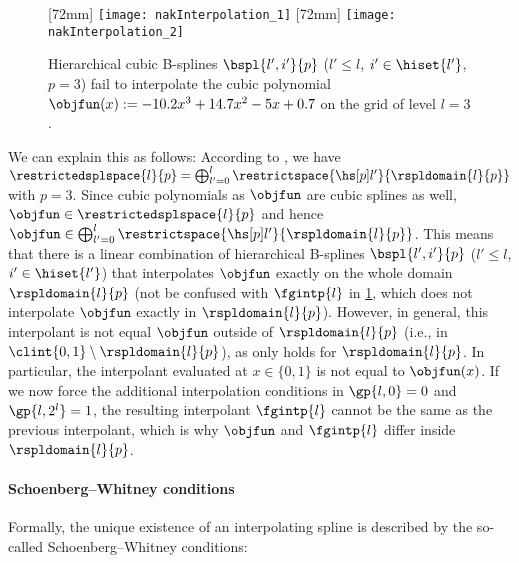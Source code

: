 \begin{figure}
  [72mm]{%
    \texttt{[image: nakInterpolation\_1]}%
  }%
  \hfill%
  [72mm]{%
    \texttt{[image: nakInterpolation\_2]}%
  }%
  \caption[%
    Issues when interpolating with uniform hierarchical B-splines%
  ]{%
    Hierarchical cubic B-splines $\bspl{l',i'}{p}$
    ($l' \le l$, $i' \in \hiset{l'}$, $p = 3$)
    fail to interpolate the cubic polynomial
    $\objfun(x) := -10.2 x^3 + 14.7 x^2 - 5x + 0.7$
    on the grid of level $l = 3$.%
  }%
  \label{fig:nakInterpolation}%
\end{figure}

We can explain this as follows:
According to ,
we have $\restrictedsplspace{l}{p} = \bigoplus_{l'=0}^l \restrictspace{\hsbspl{l'}{p}}{\rspldomain{l}{p}}$
with $p = 3$.
Since cubic polynomials as $\objfun$ are cubic splines as well,
$\objfun \in \restrictedsplspace{l}{p}$ and hence
$\objfun \in \bigoplus_{l'=0}^l \restrictspace{\hsbspl{l'}{p}}{\rspldomain{l}{p}}$.
This means that there is a linear combination of hierarchical B-splines
$\bspl{l',i'}{p}$ ($l' \le l$, $i' \in \hiset{l'}$)
that interpolates $\objfun$ exactly on the whole domain $\rspldomain{l}{p}$
(not be confused with $\fgintp{l}$ in \cref{fig:nakInterpolation},
which does not interpolate $\objfun$ exactly in $\rspldomain{l}{p}$).
However, in general, this interpolant is not equal $\objfun$ outside
of $\rspldomain{l}{p}$ (i.e., in $\clint{0, 1} \setminus \rspldomain{l}{p}$),
as  only holds for $\rspldomain{l}{p}$.
In particular, the interpolant evaluated at $x \in \{0, 1\}$ is not
equal to $\objfun(x)$.
If we now force the additional interpolation conditions in
$\gp{l,0} = 0$ and $\gp{l,2^l} = 1$,
the resulting interpolant $\fgintp{l}$ cannot be the same as the previous
interpolant,
which is why $\objfun$ and $\fgintp{l}$ differ inside $\rspldomain{l}{p}$.

\paragraph{Schoenberg--Whitney conditions}

Formally, the unique existence of an interpolating spline is
described by the so-called Schoenberg--Whitney conditions:

